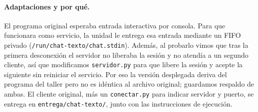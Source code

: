 \documentclass[11pt,a4paper]{article}
\newcommand{\ruta}[1]{\nolinkurl{#1}}
\begin{document}
\paragraph{Adaptaciones y por qué.} El programa original esperaba entrada interactiva por consola. Para que funcionara como servicio, la unidad le entrega esa entrada mediante un FIFO privado (\ruta{/run/chat-texto/chat.stdin}). Además, al probarlo vimos que tras la primera desconexión el servidor no liberaba la sesión y no atendía a un segundo cliente, así que modificamos \texttt{servidor.py} para que libere la sesión y acepte la siguiente sin reiniciar el servicio. Por eso la versión desplegada deriva del programa del taller pero no es idéntica al archivo original; guardamos respaldo de ambas. El cliente original, más un \texttt{conectar.py} para indicar servidor y puerto, se entrega en \ruta{entrega/chat-texto/}, junto con las instrucciones de ejecución.
\end{document}
